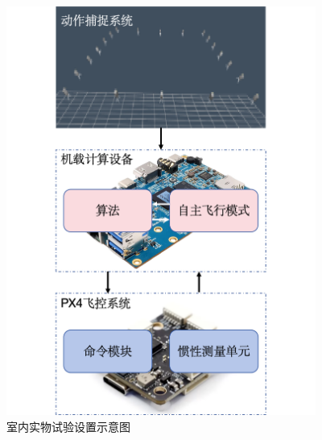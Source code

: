 \documentclass[lang=chs, degree=master, blindreview=true, winfonts=true]{yanputhesis}
\begin{document}
\begin{figure}[hbt!]
	\centering
	\hspace{-1.1cm}
	\includegraphics[width=24pc]{picture/5_10.png} 
	\caption{室内实物试验设置示意图} 
	\label{framewor}
\end{figure}




\end{document}
